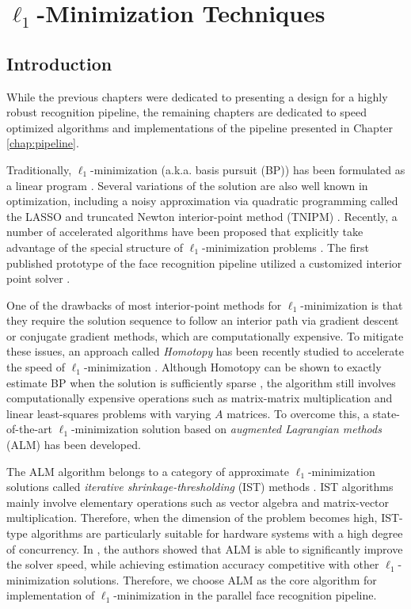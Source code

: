 \chapter{$\ell_1$-Minimization Techniques}
\label{chap:minimization}

\section{Introduction}
While the previous chapters were dedicated to presenting a design for a highly
robust recognition pipeline, the remaining chapters are dedicated to speed optimized
algorithms and implementations of the pipeline presented in Chapter
\ref{chap:pipeline}.  

Traditionally, $\ell_1$-minimization (a.k.a.
basis pursuit (BP)) has been formulated as a linear program
\cite{ChenS2001-SIAM}. 
Several variations of the solution are also well known
in optimization, including a noisy approximation via quadratic programming
called the LASSO \cite{TibshiraniR1996} and truncated Newton interior-point
method (TNIPM) \cite{KimS2007}.
Recently, a number of accelerated algorithms have been proposed that
explicitly take advantage of the special structure of $\ell_1$-minimization
problems \cite{LorisI2009,YangA2010-ICIP}. 
The first published prototype of the face recognition pipeline utilized a customized
interior point solver \cite{WagnerA2009-CVPR}.  


One of the drawbacks of most interior-point methods for $\ell_1$-minimization
is that they require the solution sequence to follow an interior path via
gradient descent or conjugate gradient methods, which are computationally
expensive.  To mitigate these issues, an approach called \emph{Homotopy} has
been recently studied to accelerate the speed of $\ell_1$-minimization
\cite{OsborneM2000,EfronB2004,MalioutovD2005,DonohoD2006}.  Although Homotopy
can be shown to exactly estimate BP when the solution is sufficiently sparse
\cite{DonohoD2006}, the algorithm still involves computationally expensive
operations such as matrix-matrix multiplication and linear least-squares
problems with varying $A$ matrices.  To overcome this, a state-of-the-art
$\ell_1$-minimization solution based on \emph{augmented Lagrangian methods}
(ALM) \cite{BertsekasD2003,YangA2010-ICIP} has been developed.

The ALM algorithm belongs to a
category of approximate $\ell_1$-minimization solutions called \emph{iterative
shrinkage-thresholding} (IST) methods \cite{WrightS2008,BeckA2009}.  IST
algorithms mainly involve elementary operations such as vector algebra and
matrix-vector multiplication. Therefore, when the dimension of the problem
becomes high, IST-type algorithms are particularly suitable for hardware
systems with a high degree of concurrency. In \cite{YangA2010-ICIP}, the
authors showed that ALM is able to significantly improve the solver speed,
while achieving estimation accuracy competitive with other $\ell_1$-minimization
solutions. Therefore, we choose ALM as the core algorithm for
implementation of $\ell_1$-minimization in the parallel face recognition pipeline.


